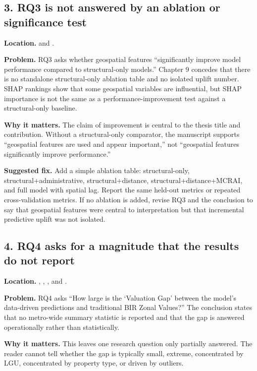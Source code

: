 \documentclass[11pt]{article}
\begin{document}
\subsection*{3. RQ3 is not answered by an ablation or significance test}

\textbf{Location.}  and .

\textbf{Problem.} RQ3 asks whether geospatial features ``significantly improve model performance compared to structural-only models.'' Chapter 9 concedes that there is no standalone structural-only ablation table and no isolated uplift number. SHAP rankings show that some geospatial variables are influential, but SHAP importance is not the same as a performance-improvement test against a structural-only baseline.

\textbf{Why it matters.} The claim of improvement is central to the thesis title and contribution. Without a structural-only comparator, the manuscript supports ``geospatial features are used and appear important,'' not ``geospatial features significantly improve performance.''

\textbf{Suggested fix.} Add a simple ablation table: structural-only, structural+administrative, structural+distance, structural+distance+MCRAI, and full model with spatial lag. Report the same held-out metrics or repeated cross-validation metrics. If no ablation is added, revise RQ3 and the conclusion to say that geospatial features were central to interpretation but that incremental predictive uplift was not isolated.

\subsection*{4. RQ4 asks for a magnitude that the results do not report}

\textbf{Location.} , , , and .

\textbf{Problem.} RQ4 asks ``How large is the `Valuation Gap' between the model's data-driven predictions and traditional BIR Zonal Values?'' The conclusion states that no metro-wide summary statistic is reported and that the gap is answered operationally rather than statistically.

\textbf{Why it matters.} This leaves one research question only partially answered. The reader cannot tell whether the gap is typically small, extreme, concentrated by LGU, concentrated by property type, or driven by outliers.
\end{document}
